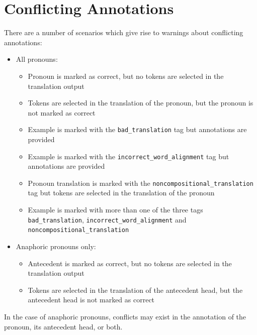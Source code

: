 \documentclass[11pt]{article} %
\newcommand\tag[1]{\texttt{#1}}
\begin{document}
\section{Conflicting Annotations}
\label{ConflictingAnnotations}
There are a number of scenarios which give rise to warnings about conflicting annotations:
\begin{itemize}
  \item All pronouns:
  \begin{itemize}
    \item Pronoun is marked as correct, but no tokens are selected in the translation output
    \item Tokens are selected in the translation of the pronoun, but the pronoun is not marked as correct
    \item Example is marked with the \tag{bad\_translation} tag but annotations are provided
    \item Example is marked with the \tag{incorrect\_word\_alignment} tag but annotations are provided
    \item Pronoun translation is marked with the \tag{noncompositional\_translation} tag but tokens are selected in the translation of the pronoun
    \item Example is marked with more than one of the three tags \tag{bad\_translation}, \tag{incorrect\_word\_alignment} and \tag{noncompositional\_translation}
  \end{itemize}
  \item Anaphoric pronouns only:
  \begin{itemize}
    \item Antecedent is marked as correct, but no tokens are selected in the translation output
    \item Tokens are selected in the translation of the antecedent head, but the antecedent head is not marked as correct 
  \end{itemize}
\end{itemize}

In the case of anaphoric pronouns, conflicts may exist in the annotation of the pronoun, its antecedent head, or both.
\end{document}
